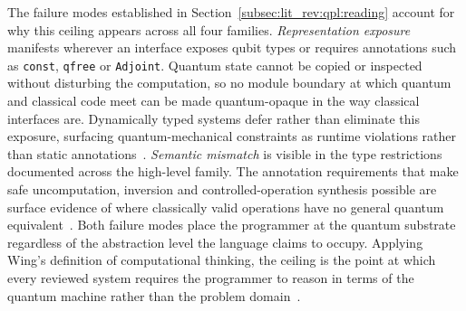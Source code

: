The failure modes established in Section~\ref{subsec:lit_rev:qpl:reading} account for why this ceiling appears across all four families.
\textit{Representation exposure} manifests wherever an interface exposes qubit types or requires annotations such as \texttt{const}, \texttt{qfree} or \texttt{Adjoint}.
Quantum state cannot be copied or inspected without disturbing the computation, so no module boundary at which quantum and classical code meet can be made quantum-opaque in the way classical interfaces are.
Dynamically typed systems defer rather than eliminate this exposure, surfacing quantum-mechanical constraints as runtime violations rather than static annotations~\cite{wright2024quff}.
\textit{Semantic mismatch} is visible in the type restrictions documented across the high-level family.
The annotation requirements that make safe uncomputation, inversion and controlled-operation synthesis possible are surface evidence of where classically valid operations have no general quantum equivalent~\cite{yuan2025foundationalabstractions}.
Both failure modes place the programmer at the quantum substrate regardless of the abstraction level the language claims to occupy.
Applying Wing's definition of computational thinking, the ceiling is the point at which every reviewed system requires the programmer to reason in terms of the quantum machine rather than the problem domain~\cite{Wing2006ComputationalThinking}.

